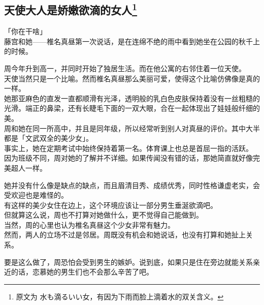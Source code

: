 \subsection[天使大人是娇嫩欲滴的女人]{天使大人是娇嫩欲滴的女人\footnote{原文为 {\jpfont 水も滴るいい女}，有因为下雨而脸上滴着水的双关含义。}}

「你在干啥」\\

藤宫和她——椎名真昼第一次说话，是在连绵不绝的雨中看到她坐在公园的秋千上的时候。\\

\vspace{2\baselineskip}

周今年升到高一，并同时开始了独居生活。而在他公寓的右邻住着一位天使。\\

天使当然只是一个比喻。然而椎名真昼那么美丽可爱，使得这个比喻仿佛像是真的一样。\\

她那亚麻色的直发一直都顺滑有光泽，透明般的乳白色皮肤保持着没有一丝粗糙的光滑。端正的鼻梁，还有长睫毛下面的一双大眼，合在一起体现出了娃娃般纤细的美。\\

周和她在同一所高中，并且是同年级，所以经常听到别人对真昼的评价。其中大半都是「文武双全的美少女」。\\

事实上，她在定期考试中始终保持着第一名。体育课上也总是首屈一指的活跃。\\

因为班级不同，周对她的了解并不详细。如果传闻没有错的话，那她简直就好像完美超人一样。

她并没有什么像是缺点的缺点，而且眉清目秀、成绩优秀，同时性格谦虚老实，会受欢迎也是难怪的。\\

有这样的美少女住在边上，这个环境应该让一部分男生垂涎欲滴吧。\\

但就算这么说，周也不打算对她做什么，更不觉得自己能做到。\\

当然，周的心里也认为椎名真昼这个少女非常有魅力。\\

然而，两人的立场不过是邻居。周既没有机会和她说话，也没有打算和她扯上关系。

要是这么做了，周恐怕会受到男生的嫉妒。说到底，如果只是住在旁边就能关系亲近的话，恋慕她的男生们也不会那么辛苦了吧。\\

